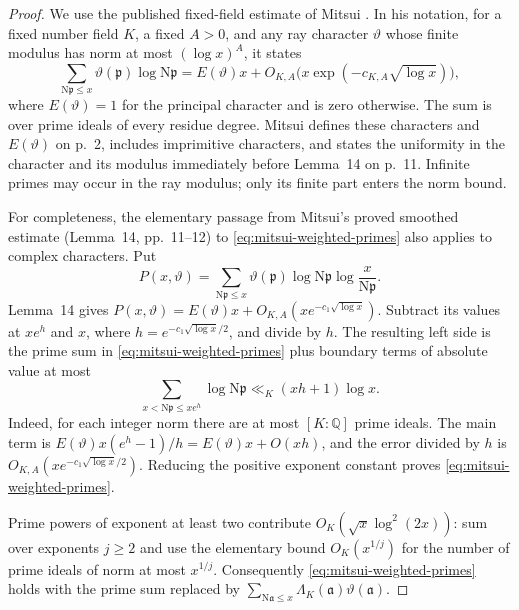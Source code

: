 \documentclass[11pt]{article}
\theoremstyle{definition}
\theoremstyle{remark}
\newcommand{\Q}{\mathbb Q}
\begin{document}
\begin{proof}
We use the published fixed-field estimate of Mitsui
\cite[\S1, Lemma~15, p.~12]{Mitsui1956}.
In his notation, for a fixed number field $K$, a fixed $A>0$, and any
ray character $\vartheta$ whose finite modulus has norm at most
$(\log x)^A$, it states
\begin{equation}\label{eq:mitsui-weighted-primes}
 \sum_{\mathrm N\mathfrak p\leq x}
       \vartheta(\mathfrak p)\log\mathrm N\mathfrak p
 =E(\vartheta)x+
 O_{K,A}\bigl(x\exp(-c_{K,A}\sqrt{\log x})\bigr),
\end{equation}
where $E(\vartheta)=1$ for the principal character and is zero otherwise.
The sum is over prime ideals of every residue degree.
Mitsui defines these characters and $E(\vartheta)$ on p.~2, includes
imprimitive characters, and states the uniformity in the character
and its modulus immediately before Lemma~14 on p.~11.
Infinite primes may occur in the ray modulus; only its finite part
enters the norm bound.

For completeness, the elementary passage from Mitsui's proved
smoothed estimate (Lemma~14, pp.~11--12) to
\eqref{eq:mitsui-weighted-primes} also applies to complex characters.
Put
\[
 P(x,\vartheta)=\sum_{\mathrm N\mathfrak p\leq x}
  \vartheta(\mathfrak p)\log\mathrm N\mathfrak p
                         \log\frac{x}{\mathrm N\mathfrak p}.
\]
Lemma~14 gives $P(x,\vartheta)=E(\vartheta)x+
O_{K,A}(xe^{-c_1\sqrt{\log x}})$.
Subtract its values at $xe^h$ and $x$, where
$h=e^{-c_1\sqrt{\log x}/2}$, and divide by $h$.
The resulting left side is the prime sum in
\eqref{eq:mitsui-weighted-primes} plus boundary terms of absolute
value at most
\[
 \sum_{x<\mathrm N\mathfrak p\leq xe^h}\log\mathrm N\mathfrak p
       \ll_K(xh+1)\log x.
\]
Indeed, for each integer norm there are at most $[K:\Q]$ prime ideals.
The main term is $E(\vartheta)x(e^h-1)/h=E(\vartheta)x+O(xh)$,
and the error divided by $h$ is
$O_{K,A}(xe^{-c_1\sqrt{\log x}/2})$.
Reducing the positive exponent constant proves
\eqref{eq:mitsui-weighted-primes}.

Prime powers of exponent at least two contribute
$O_K(\sqrt x\log^2(2x))$: sum over exponents $j\geq2$ and use the
elementary bound $O_K(x^{1/j})$ for the number of prime ideals of norm
at most $x^{1/j}$.
Consequently \eqref{eq:mitsui-weighted-primes} holds with the prime
sum replaced by
$\sum_{\mathrm N\mathfrak a\leq x}
\Lambda_K(\mathfrak a)\vartheta(\mathfrak a)$.


\end{proof}
\end{document}
